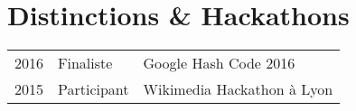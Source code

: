 \documentclass[
  french,
  a4paper
]{resume-openfont}
\begin{document}
\begin{minipage}[t]{0.66\textwidth}

\section{Distinctions \& Hackathons}
\begin{tabular}{@{}rll}
2016       & Finaliste   & Google Hash Code 2016\\
2015       & Participant & Wikimedia Hackathon à Lyon
\end{tabular}
\sectionsep

\end{minipage}
\end{document}
